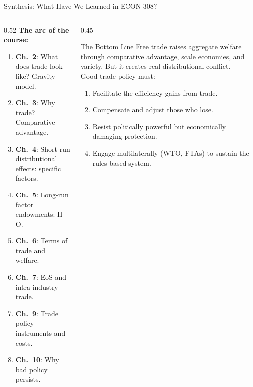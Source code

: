 \documentclass[aspectratio=169]{beamer}
\begin{document}
\begin{frame}{Synthesis: What Have We Learned in ECON 308?}
\begin{columns}
\begin{column}{0.52\textwidth}
\textbf{The arc of the course:}
\begin{enumerate}\small
  \item \textbf{Ch.~2}: What does trade look like? Gravity model.
  \item \textbf{Ch.~3}: Why trade? Comparative advantage.
  \item \textbf{Ch.~4}: Short-run distributional effects: specific factors.
  \item \textbf{Ch.~5}: Long-run factor endowments: H-O.
  \item \textbf{Ch.~6}: Terms of trade and welfare.
  \item \textbf{Ch.~7}: EoS and intra-industry trade.
  \item \textbf{Ch.~9}: Trade policy instruments and costs.
  \item \textbf{Ch.~10}: Why bad policy persists.
\end{enumerate}
\end{column}
\begin{column}{0.45\textwidth}
\begin{insight}{The Bottom Line}
  Free trade raises aggregate welfare through comparative advantage, scale economies, and variety. But it creates real distributional conflict.\\[0.4em]
  Good trade policy must:
  \begin{enumerate}\small
    \item Facilitate the efficiency gains from trade.
    \item Compensate and adjust those who lose.
    \item Resist politically powerful but economically damaging protection.
    \item Engage multilaterally (WTO, FTAs) to sustain the rules-based system.
  \end{enumerate}
\end{insight}
\end{column}
\end{columns}
\end{frame}
\end{document}
